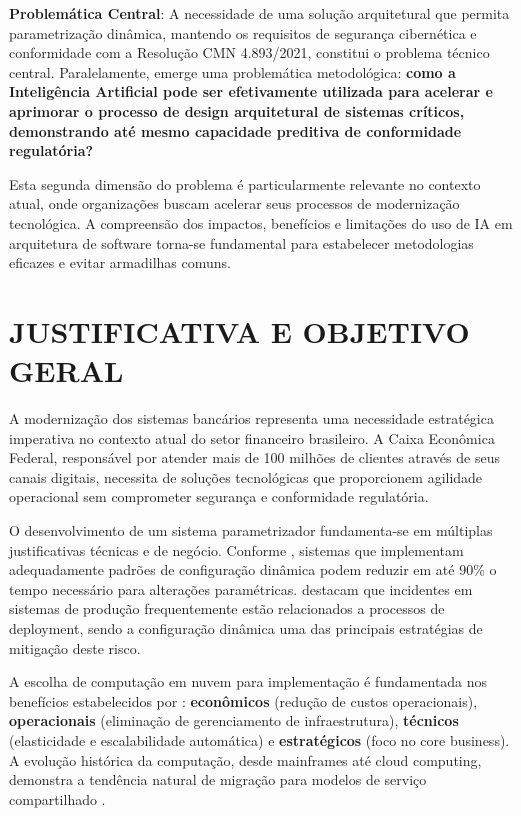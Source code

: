 \textbf{Problemática Central}: A necessidade de uma solução arquitetural que permita parametrização dinâmica, mantendo os requisitos de segurança cibernética e conformidade com a Resolução CMN 4.893/2021, constitui o problema técnico central. Paralelamente, emerge uma problemática metodológica: \textbf{como a Inteligência Artificial pode ser efetivamente utilizada para acelerar e aprimorar o processo de design arquitetural de sistemas críticos, demonstrando até mesmo capacidade preditiva de conformidade regulatória?}

Esta segunda dimensão do problema é particularmente relevante no contexto atual, onde organizações buscam acelerar seus processos de modernização tecnológica. A compreensão dos impactos, benefícios e limitações do uso de IA em arquitetura de software torna-se fundamental para estabelecer metodologias eficazes e evitar armadilhas comuns.

\chapter{JUSTIFICATIVA E OBJETIVO GERAL}

A modernização dos sistemas bancários representa uma necessidade estratégica imperativa no contexto atual do setor financeiro brasileiro. A Caixa Econômica Federal, responsável por atender mais de 100 milhões de clientes através de seus canais digitais, necessita de soluções tecnológicas que proporcionem agilidade operacional sem comprometer segurança e conformidade regulatória.

O desenvolvimento de um sistema parametrizador fundamenta-se em múltiplas justificativas técnicas e de negócio. Conforme , sistemas que implementam adequadamente padrões de configuração dinâmica podem reduzir em até 90\% o tempo necessário para alterações paramétricas.  destacam que incidentes em sistemas de produção frequentemente estão relacionados a processos de deployment, sendo a configuração dinâmica uma das principais estratégias de mitigação deste risco.

A escolha de computação em nuvem para implementação é fundamentada nos benefícios estabelecidos por : \textbf{econômicos} (redução de custos operacionais), \textbf{operacionais} (eliminação de gerenciamento de infraestrutura), \textbf{técnicos} (elasticidade e escalabilidade automática) e \textbf{estratégicos} (foco no core business). A evolução histórica da computação, desde mainframes até cloud computing, demonstra a tendência natural de migração para modelos de serviço compartilhado .

